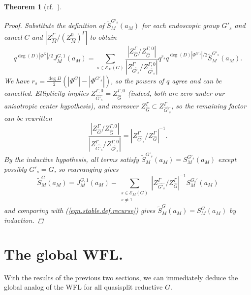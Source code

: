 \documentclass[openany]{amsbook}
\newtheorem{theorem}{Theorem}[chapter]
\theoremstyle{definition}
\theoremstyle{remark}
\numberwithin{equation}{section}
\newcommand{\cE}{\mathcal{E}}
\renewcommand{\-}{\operatorname{-}}
\newcommand{\wtilde}[1]{\widetilde{#1}}
\begin{document}
\begin{theorem}[{cf.\ \cite[Th\'eor\`eme 14.1.1]{CLII}}]
\begin{proof}
    Substitute the definition of $\wtilde{S}_M^{G'_s}(a_M)$ for each endoscopic group $G'_s$ and cancel $C$ and $|Z^\Gamma_{\widehat{M}}/(Z^0_{\widehat{M}})^\Gamma|$ to obtain
    $$
        q^{\deg(D) |\Phi^G|/2} J^{G,1}_M(a_M) =  \sum_{s \in {\cE}_{M}(G)} \frac{|Z_{\widehat{G}}^\Gamma/Z_{\widehat{G}}^{\Gamma,0}|}{|Z_{\widehat{G'_s}}^\Gamma/Z_{\widehat{G'_s}}^{\Gamma,0}|} q^{r_s} q^{\deg(D)|\Phi^{G'_s}|/2} \wtilde{S}_M^{G'_s}(a_M).  
    $$
    We have $r_s = \frac{\deg D}{2}(|\Phi^G| - |\Phi^{G'_s}|)$, so the powers of $q$ agree and can be cancelled. Ellipticity implies $Z^{\Gamma,0}_{\widehat{G'_s}} = Z^{\Gamma,0}_{\widehat{G}}$ (indeed, both are zero under our anisotropic center hypothesis), and moreover $Z^\Gamma_{\widehat{G}} \subset Z^\Gamma_{\widehat{G'_s}}$, so the remaining factor can be rewritten
    $$
        \frac{|Z_{\widehat{G}}^\Gamma/Z_{\widehat{G}}^{\Gamma,0}|}{|Z_{\widehat{G'_s}}^\Gamma/Z_{\widehat{G'_s}}^{\Gamma,0}|} = |Z_{\widehat{G'_s}}^\Gamma/Z_{\widehat{G}}^\Gamma|^{-1}.
    $$
    By the inductive hypothesis, all terms satisfy $\wtilde{S}^{G'_s}_M(a_M) = S^{G'_s}_M(a_M)$ except possibly $G'_s = G$, so rearranging gives
    $$
        \wtilde{S}^{G}_M(a_M) = J_M^{G,1}(a_M) - \sum_{\substack{s \in \cE_M(G) \\ s \neq 1}} |Z_{\widehat{G'_s}}^\Gamma/Z_{\widehat{G}}^\Gamma|^{-1} S^{G_s'}_M(a_M)
    $$
    and comparing with (\ref{eqn.stable.def.recurse}) gives $\wtilde{S}^{G}_M(a_M) = S^{G}_M(a_M)$ by induction. 
\end{proof}
\end{theorem}





\section{The global WFL.}

With the results of the previous two sections, we can immediately deduce the global analog of the WFL for all quasisplit reductive $G$. 
\end{document}
